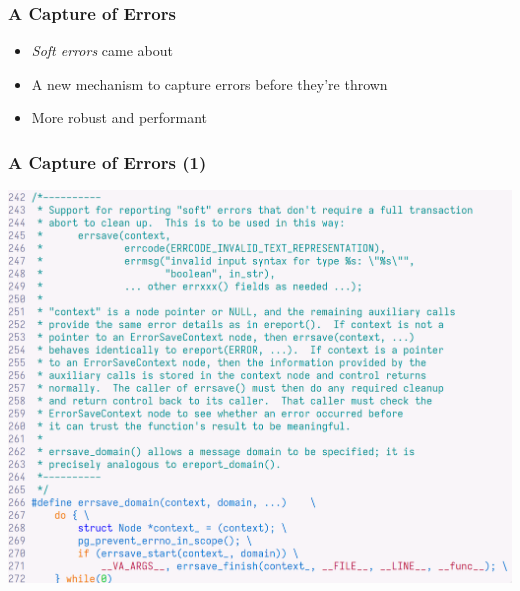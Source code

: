 \begin{frame}
  \frametitle{A Capture of Errors}

  \begin{itemize}
    \item \textit{Soft errors} came about
    \item A new mechanism to capture errors before they're thrown
    \item More robust and performant
  \end{itemize}
  \centering {}
\end{frame}

\begin{frame}[plain]
  \frametitle{A Capture of Errors (1)}
  \centering \includegraphics[height=0.9\textheight,frame]{errsave.png}
\end{frame}

